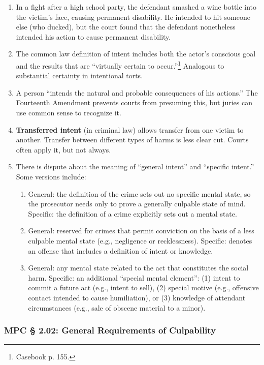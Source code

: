 \begin{enumerate}
    \item In a fight after a high school party, the defendant smashed a wine bottle into the victim's face, causing permanent disability. He intended to hit someone else (who ducked), but the court found that the defendant nonetheless intended his action to cause permanent disability.
    \item The common law definition of intent includes both the actor's conscious goal and the results that are ``virtually certain to occur.''\footnote{Casebook p. 155.} Analogous to substantial certainty in intentional torts.
    \item A person ``intends the natural and probable consequences of his actions.'' The Fourteenth Amendment prevents courts from presuming this, but juries can use common sense to recognize it.
    \item \textbf{Transferred intent} (in criminal law) allows transfer from one victim to another. Transfer between different types of harms is less clear cut. Courts often apply it, but not always.
    \item There is dispute about the meaning of ``general intent'' and ``specific intent.'' Some versions include:
    \begin{enumerate}
        \item General: the definition of the crime sets out no specific mental state, so the prosecutor needs only to prove a generally culpable state of mind. Specific: the definition of a crime explicitly sets out a mental state.
        \item General: reserved for crimes that permit conviction on the basis of a less culpable mental state (e.g., negligence or recklessness). Specific: denotes an offense that includes a definition of intent or knowledge.
        \item General: any mental state related to the act that constitutes the social harm. Specific: an additional ``special mental element'': (1) intent to commit a future act (e.g., intent to sell), (2) special motive (e.g., offensive contact intended to cause humiliation), or (3) knowledge of attendant circumstances (e.g., sale of obscene material to a minor).
    \end{enumerate}
\end{enumerate}

\subsubsection{MPC § 2.02: General Requirements of Culpability}

